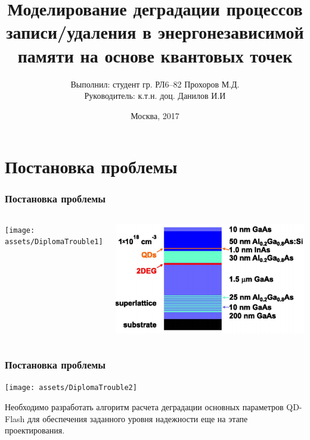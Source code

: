 \documentclass[10pt,pdf,hyperref={unicode},aspectratio={169}]{beamer}
\title{Моделирование деградации процессов записи/удаления в энергонезависимой памяти на основе квантовых точек}
\author[Прохоров М.Д.]{Выполнил: студент гр. РЛ6--82 Прохоров М.Д.\\ Руководитель: к.т.н. доц. Данилов И.И}
\date{Москва, 2017}
\institute[BMSTU]{МГТУ им. Н.Э.Баумана}
\begin{document}
\begin{frame}
	\titlepage
\end{frame} 

\section{Постановка проблемы}
\begin{frame}
	\frametitle{Постановка проблемы}
	\begin{columns}
		\begin{center}
			\texttt{[image: assets/DiplomaTrouble1]}
		\end{center}
		\begin{center}
			\includegraphics[width=\textwidth]{assets/Flash}
		\end{center}
	\end{columns}
\end{frame}
\begin{frame}
	\frametitle{Постановка проблемы}
	\begin{center}
		\texttt{[image: assets/DiplomaTrouble2]}
	\end{center}
	Необходимо разработать алгоритм расчета деградации основных параметров QD-Flash для обеспечения заданного уровня надежности еще на этапе проектирования.
\end{frame}
\end{document}
